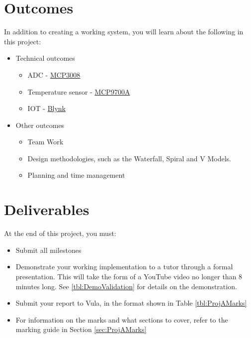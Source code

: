\section{Outcomes}
In addition to creating a working system, you will learn about the following in this project:
\begin{itemize}
    \item Technical outcomes
    \begin{itemize}
        \item ADC - \href{https://cdn-shop.adafruit.com/datasheets/MCP3008.pdf}{MCP3008}
        \item Temperature sensor - \href{http://ww1.microchip.com/downloads/en/devicedoc/20001942g.pdf}{MCP9700A}
        \item IOT - \href{https://blynk.io/}{Blynk}
    \end{itemize}
    \item Other outcomes
    \begin{itemize}
        \item Team Work
        \item Design methodologies, such as the Waterfall, Spiral and V Models.
        \item Planning and time management
    \end{itemize}
    
    
\end{itemize}

\section{Deliverables}
At the end of this project, you must:
\begin{itemize}
    \item Submit all milestones
    \item Demonstrate your working implementation to a tutor through a formal presentation. This will take the form of a YouTube video no longer than 8 minutes long. See \ref{tbl:DemoValidation} for details on the demonstration.
    \item Submit your report to Vula, in the format shown in Table \ref{tbl:ProjAMarks}
    \item For information on the marks and what sections to cover, refer to the marking guide in Section \ref{sec:ProjAMarks}
\end{itemize}

